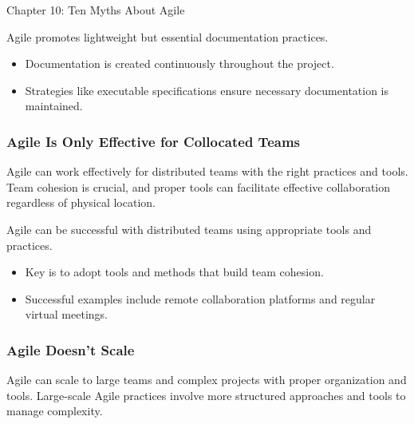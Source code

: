 \begin{notes}{Chapter 10: Ten Myths About Agile}
    \begin{highlight}
    
        Agile promotes lightweight but essential documentation practices.
        
        \begin{itemize}
            \item Documentation is created continuously throughout the project.
            \item Strategies like executable specifications ensure necessary documentation is maintained.
        \end{itemize}
    
    \end{highlight}
    
    \subsubsection*{Agile Is Only Effective for Collocated Teams}
    
    Agile can work effectively for distributed teams with the right practices and tools. Team cohesion is crucial, and proper tools can facilitate effective collaboration regardless of physical location.
    
    \begin{highlight}
    
        Agile can be successful with distributed teams using appropriate tools and practices.
        
        \begin{itemize}
            \item Key is to adopt tools and methods that build team cohesion.
            \item Successful examples include remote collaboration platforms and regular virtual meetings.
        \end{itemize}
    
    \end{highlight}
    
    \subsubsection*{Agile Doesn't Scale}
    
    Agile can scale to large teams and complex projects with proper organization and tools. Large-scale Agile practices involve more structured approaches and tools to manage complexity.
    

\end{notes}
